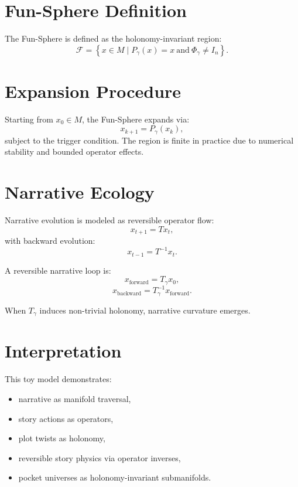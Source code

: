 \documentclass[11pt]{article}
\begin{document}
\section{Fun-Sphere Definition}

The Fun-Sphere is defined as the holonomy-invariant region:
\[
\mathcal{F} =
\left\{
x \in M \mid
P_{\gamma}(x) = x \ \text{and} \ \Phi_{\gamma} \neq I_n
\right\}.
\]

\section{Expansion Procedure}

Starting from $x_0 \in M$, the Fun-Sphere expands via:
\[
x_{k+1} = P_{\gamma}(x_k),
\]
subject to the trigger condition. The region is finite in practice due
to numerical stability and bounded operator effects.

\section{Narrative Ecology}

Narrative evolution is modeled as reversible operator flow:
\[
x_{t+1} = T x_t,
\]
with backward evolution:
\[
x_{t-1} = T^{-1} x_t.
\]

A reversible narrative loop is:
\[
x_{\text{forward}} = T_{\gamma} x_0,
\]
\[
x_{\text{backward}} = T_{\gamma}^{-1} x_{\text{forward}}.
\]

When $T_{\gamma}$ induces non-trivial holonomy, narrative curvature
emerges.

\section{Interpretation}

This toy model demonstrates:
\begin{itemize}
    \item narrative as manifold traversal,
    \item story actions as operators,
    \item plot twists as holonomy,
    \item reversible story physics via operator inverses,
    \item pocket universes as holonomy-invariant submanifolds.
\end{itemize}
\end{document}
